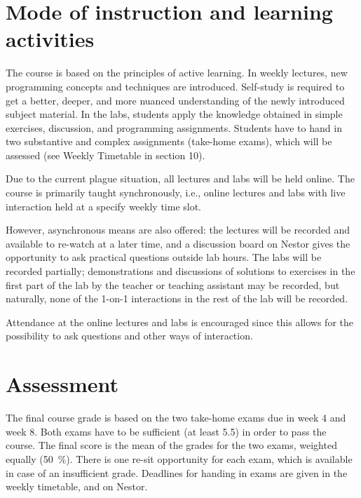 \documentclass[a4paper,12pt]{article}
\begin{document}
\section{Mode of instruction and learning activities}
The course is based on the principles of active learning. In weekly lectures,
new programming concepts and techniques are introduced. Self-study is
required to get a better, deeper, and more nuanced understanding of the newly
introduced subject material. In the labs, students apply the knowledge obtained
in simple exercises, discussion, and programming assignments. Students have to
hand in two substantive and complex assignments (take-home exams), which will
be assessed (see Weekly Timetable in section 10). %


Due to the current plague situation, all lectures and labs will be held
online. The course is primarily taught synchronously, i.e., online lectures
and labs with live interaction held at a specify weekly time slot.

However, asynchronous means are also offered: the lectures will be recorded and
available to re-watch at a later time, and a discussion board on Nestor gives
the opportunity to ask practical questions outside lab hours. The labs will
be recorded partially; demonstrations and discussions of solutions to
exercises in the first part of the lab by the teacher or teaching assistant
may be recorded, but naturally, none of the 1-on-1 interactions in the rest of
the lab will be recorded.

Attendance at the online lectures and labs is encouraged since this allows for
the possibility to ask questions and other ways of interaction.

\section{Assessment}
The final course grade is based on the two take-home exams due in week 4 and
week 8. Both exams have to be sufficient (at least 5.5) in order to pass
the course. The final score is the mean of the grades for the two exams,
weighted equally (50~\%). There is one re-sit opportunity for each exam, which
is available in case of an insufficient grade. Deadlines for handing in
exams are given in the weekly timetable, and on Nestor.
\end{document}
